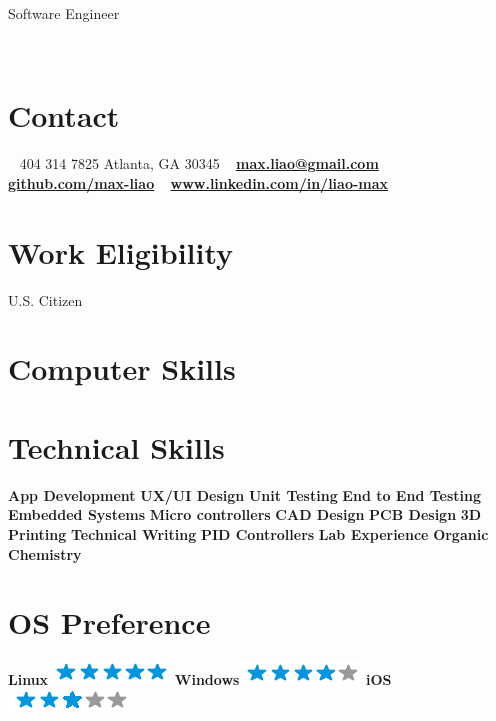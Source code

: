 \documentclass[]{cv}
\begin{document}
{Software Engineer}
\par

\begin{aside}
	~
	~
	~
	~
	~
	\section{Contact}
	~
	404 314 7825
		{\small Atlanta, GA 30345}
	~
	\href{mailto:max.liao@gmail.com}{\textbf{max.liao@gmail.com}}
	~
	\href{github.com/max-liao}{\textbf{github.com/max-liao}}
	~
	\href{www.linkedin.com/in/liao-max}{\textbf{\scriptsize www.linkedin.com/in/liao-max}}
	~
	\section{\large Work Eligibility \vspace{0.1cm}}
	U.S. Citizen
	\section{\large Computer Skills \vspace{0.2cm}}
	\section{\large Technical Skills \vspace{0.1cm}}
	\textbf{App Development}
	\textbf{UX/UI Design}
	\textbf{Unit Testing}
	\textbf{End to End Testing}
	\textbf{Embedded Systems}
	\textbf{Micro controllers}
	\textbf{CAD Design}
	\textbf{PCB Design}
	\textbf{3D Printing}
	\textbf{Technical Writing}
	\textbf{PID Controllers}
	\textbf{Lab Experience}
	\textbf{Organic Chemistry}
	~
	\section{OS Preference \vspace{0.1cm}}
	\textbf{Linux}\includegraphics[scale=0.40]{img/5stars.png}
	\textbf{Windows}\includegraphics[scale=0.40]{img/4stars.png}
	\textbf{iOS}\includegraphics[scale=0.40]{img/3stars.png}
	~

\end{aside}
\end{document}

